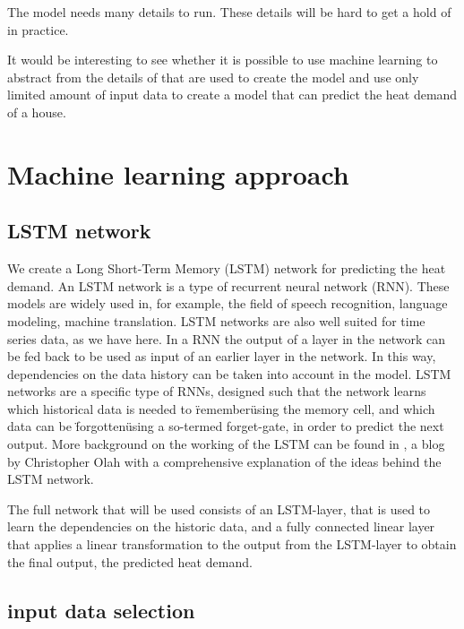 The model needs many details to run. These details will be hard to get a hold of in practice.

It would be interesting to see whether it is possible to use machine learning to abstract from the details of that are used to create the model and use only limited amount of input data to create a model that can predict the heat demand of a house. 

 




\section{Machine learning approach}\label{s:MLA}


\subsection{LSTM network}
We create a Long Short-Term Memory (LSTM) network for predicting the heat demand. An LSTM network is a type of recurrent neural network (RNN). These models are widely used in, for example, the field of speech recognition, language modeling, machine translation. LSTM networks are also well suited for time series data, as we have here. In a RNN the output of a layer in the network can be fed back to be used as input of an earlier layer in the network. In this way, dependencies on the data history can be taken into account in the model. LSTM networks are a specific type of RNNs, designed such that the network learns which historical data is needed to \"remember\" using the memory cell, and which data can be \"forgotten\" using a so-termed forget-gate, in order to predict the next output. More background on the working of the LSTM can be found in \cite{LSTM}, a blog by Christopher Olah with a comprehensive explanation of the ideas behind the LSTM network. 

The full network that will be used consists of an LSTM-layer, that is used to learn the dependencies on the historic data, and a fully connected linear layer that applies a linear transformation to the output from the LSTM-layer to obtain the final output, the predicted heat demand. 



\subsection{input data selection}

